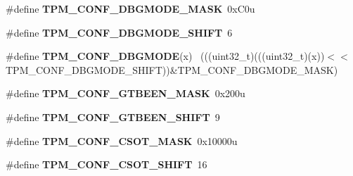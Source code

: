 \begin{DoxyCompactItemize}
\item 
\hypertarget{group___t_p_m___register___masks_gaf0d19de5100b155d1e946914e2d2756d}{}\#define {\bfseries T\+P\+M\+\_\+\+C\+O\+N\+F\+\_\+\+D\+B\+G\+M\+O\+D\+E\+\_\+\+M\+A\+S\+K}~0x\+C0u\label{group___t_p_m___register___masks_gaf0d19de5100b155d1e946914e2d2756d}

\item 
\hypertarget{group___t_p_m___register___masks_ga25ea1086410a263c975c77f31e18079c}{}\#define {\bfseries T\+P\+M\+\_\+\+C\+O\+N\+F\+\_\+\+D\+B\+G\+M\+O\+D\+E\+\_\+\+S\+H\+I\+F\+T}~6\label{group___t_p_m___register___masks_ga25ea1086410a263c975c77f31e18079c}

\item 
\hypertarget{group___t_p_m___register___masks_ga6d4a1124aa0d298b6f8322b4140246b9}{}\#define {\bfseries T\+P\+M\+\_\+\+C\+O\+N\+F\+\_\+\+D\+B\+G\+M\+O\+D\+E}(x)                                        ~(((uint32\+\_\+t)(((uint32\+\_\+t)(x))$<$$<$T\+P\+M\+\_\+\+C\+O\+N\+F\+\_\+\+D\+B\+G\+M\+O\+D\+E\+\_\+\+S\+H\+I\+F\+T))\&T\+P\+M\+\_\+\+C\+O\+N\+F\+\_\+\+D\+B\+G\+M\+O\+D\+E\+\_\+\+M\+A\+S\+K)\label{group___t_p_m___register___masks_ga6d4a1124aa0d298b6f8322b4140246b9}

\item 
\hypertarget{group___t_p_m___register___masks_ga70d64b81799a4ecd3933ea8e46618747}{}\#define {\bfseries T\+P\+M\+\_\+\+C\+O\+N\+F\+\_\+\+G\+T\+B\+E\+E\+N\+\_\+\+M\+A\+S\+K}~0x200u\label{group___t_p_m___register___masks_ga70d64b81799a4ecd3933ea8e46618747}

\item 
\hypertarget{group___t_p_m___register___masks_ga6ecd0b94ee9f74112c93027dd5833468}{}\#define {\bfseries T\+P\+M\+\_\+\+C\+O\+N\+F\+\_\+\+G\+T\+B\+E\+E\+N\+\_\+\+S\+H\+I\+F\+T}~9\label{group___t_p_m___register___masks_ga6ecd0b94ee9f74112c93027dd5833468}

\item 
\hypertarget{group___t_p_m___register___masks_gab1950d4b5e28ba67b305e3fca7f716f0}{}\#define {\bfseries T\+P\+M\+\_\+\+C\+O\+N\+F\+\_\+\+C\+S\+O\+T\+\_\+\+M\+A\+S\+K}~0x10000u\label{group___t_p_m___register___masks_gab1950d4b5e28ba67b305e3fca7f716f0}

\item 
\hypertarget{group___t_p_m___register___masks_ga007e2eccc45940318d15822a729ca061}{}\#define {\bfseries T\+P\+M\+\_\+\+C\+O\+N\+F\+\_\+\+C\+S\+O\+T\+\_\+\+S\+H\+I\+F\+T}~16\label{group___t_p_m___register___masks_ga007e2eccc45940318d15822a729ca061}


\end{DoxyCompactItemize}
